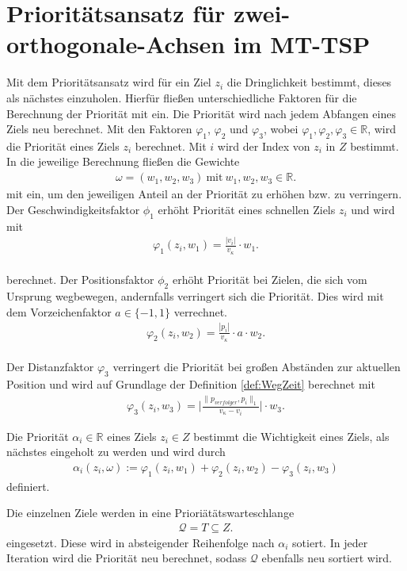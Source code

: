 \documentclass[german,version-2019-11]{uzl-thesis}
\begin{document}
\section{Prioritätsansatz für zwei-orthogonale-Achsen im MT-TSP}

Mit dem Prioritätsansatz wird für ein Ziel $z_i$ die Dringlichkeit bestimmt, dieses als nächstes einzuholen. Hierfür fließen unterschiedliche Faktoren für die Berechnung der Priorität mit ein. Die Priorität wird nach jedem Abfangen eines Ziels neu berechnet. Mit den Faktoren $\varphi_1$, $\varphi_2$ und $\varphi_3$, wobei $\varphi_1,\varphi_2,\varphi_3\in\mathbb{R}$, wird die Priorität eines Ziels $z_i$ berechnet. Mit $i$ wird der Index von $z_i$ in $Z$ bestimmt. In die jeweilige Berechnung fließen die Gewichte
\begin{align*}
\omega = (w_1, w_2 ,w_3)~\text{mit}~w_1,w_2,w_3\in\mathbb{R}.
\end{align*}
mit ein, um den jeweiligen Anteil an der Priorität zu erhöhen bzw. zu verringern.\\
Der Geschwindigkeitsfaktor $\phi_1$ erhöht Priorität eines schnellen Ziels $z_i$ und wird mit 
\begin{align}
\varphi_1(z_i, w_1) = \frac{|v_i|}{v_{\kappa}}\cdot w_1.
\end{align}\\
berechnet.
\label{def:FaktorPos}
Der Positionsfaktor $\phi_2$ erhöht Priorität bei Zielen, die sich vom Ursprung wegbewegen, andernfalls verringert sich die Priorität. Dies wird mit dem Vorzeichenfaktor $a\in\{-1,1\}$ verrechnet.
\begin{align}
\varphi_2(z_i, w_2) = \frac{|p_i|}{v_{\kappa}}\cdot a \cdot w_2.
\end{align}\\
Der Distanzfaktor $\varphi_3$ verringert die Priorität bei großen Abständen zur aktuellen Position und wird auf Grundlage der Definition \ref{def:WegZeit} berechnet mit
\begin{align}
\varphi_3(z_i, w_3) = \bigg\vert\frac{\|p_{verfolger},p_i\|_1}{v_{\kappa}-v_i}\bigg\vert \cdot w_3.
\end{align}
\begin{definition}
Die Priorität $\alpha_i\in\mathbb{R}$ eines Ziels $z_i\in Z$ bestimmt die Wichtigkeit eines Ziels, als nächstes eingeholt zu werden und wird durch
\begin{align*}
\alpha_i(z_i, \omega) := \varphi_1(z_i,w_1) + \varphi_2(z_i,w_2) - \varphi_3(z_i,w_3)
\end{align*}
definiert.
\end{definition}\noindent
Die einzelnen Ziele werden in eine Prioriätätswarteschlange
\begin{align*}
\mathcal{Q} = T\subseteq Z.
\end{align*}
eingesetzt. Diese wird in absteigender Reihenfolge nach $\alpha_i$ sotiert. In jeder Iteration wird die Priorität neu berechnet, sodass $\mathcal{Q}$ ebenfalls neu sortiert wird.
\end{document}
